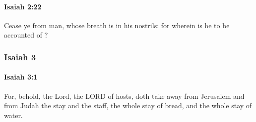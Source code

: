 		\paragraph{Isaiah 2:22} %
			\label{ISAIAH-2-22}

			Cease ye from man, whose breath is in his nostrils: for wherein is he to be accounted of ?

	\subsubsection{Isaiah 3} %
		\label{ISAIAH-3}

		\paragraph{Isaiah 3:1} %
			\label{ISAIAH-3-1}

			For, behold, the Lord, the LORD of hosts, doth take away from Jerusalem and from Judah the stay and the staff, the whole stay of bread, and the whole stay of water.

